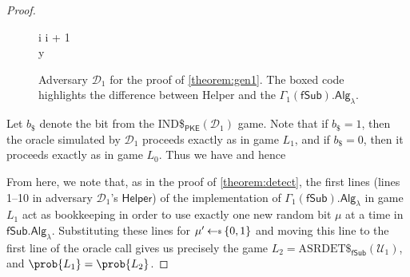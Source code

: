 \begin{proof}
\begin{figure}
\begin{pchstack}
\begin{pcvstack}
{	\pcind i \leftarrow i + 1 \\
	\pcreturn y
}
\pcvspace
{}
\end{pcvstack}
\end{pchstack}
\caption[Adversary $\mathcal{D}_1$ for the proof of \autoref{theorem:gen1}]{Adversary $\mathcal{D}_1$ for the proof of \autoref{theorem:gen1}. The boxed code highlights the difference between \textsf{Helper} and the $\Gamma_1(\mathsf{fSub}).\mathsf{Alg}_\lambda$.}
\label{game:D1}
\end{figure}

Let $b_\$$ denote the bit from the IND\$$_\mathsf{PKE}(\mathcal{D}_1)$ game. Note that if $b_\$=1$, then the oracle simulated by $\mathcal{D}_1$ proceeds exactly as in game $L_1$, and if  $b_\$=0$, then it proceeds exactly as in game $L_0$. Thus we have
and hence

From here, we note that, as in the proof of \autoref{theorem:detect}, the first lines (lines 1--10 in adversary $\mathcal{D}_1$'s $\mathsf{Helper}$) of the implementation of $\Gamma_1(\mathsf{fSub}).\mathsf{Alg}_\lambda$ in game $L_1$ act as bookkeeping in order to use exactly one new random bit $\mu$ at a time in $\mathsf{fSub}.\mathsf{Alg}_\lambda$. Substituting these lines for $\mu' \sample \{0,1\}$ and moving this line to the first line of the oracle call gives us precisely the game $L_2=\mathrm{ASRDET}\$_{\mathsf{fSub}}(\mathcal{U}_1) $, and $\prob{L_1}=\prob{L_2}$.


\end{proof}
